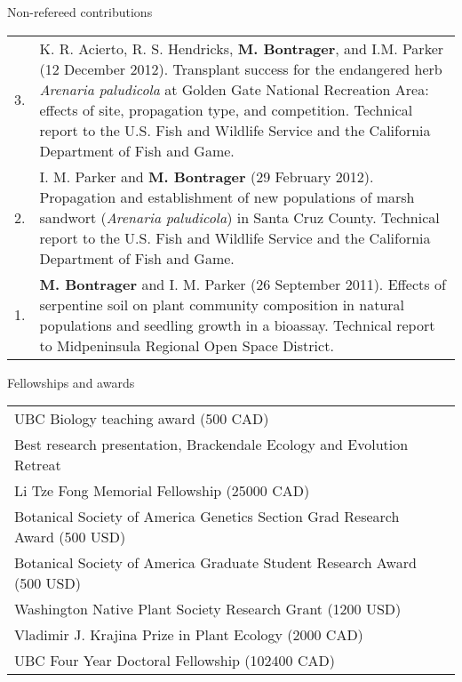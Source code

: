 \documentclass[letterpaper,11pt,oneside]{article}
\begin{document}
\bigskip
\bigskip


\bgroup
\noindent\Large{Non-refereed contributions}  
\normalsize
\bigskip

\def\arraystretch{1.2}
\noindent \begin{tabular}{@{} p{1cm} >{\raggedright\arraybackslash}p{15.11cm}}
3. & K. R. Acierto, R. S. Hendricks, \textbf{M. Bontrager}, and I.M. Parker (12 December 2012). Transplant success for the endangered herb \textit{Arenaria paludicola} at Golden Gate National Recreation Area: effects of site, propagation type, and competition. Technical report to the U.S. Fish and Wildlife Service and the California Department of Fish and Game. \\
2. & I. M. Parker and \textbf{M. Bontrager} (29 February 2012). Propagation and establishment of new populations of marsh sandwort (\textit{Arenaria paludicola}) in Santa Cruz County. Technical report to the U.S. Fish and Wildlife Service and the California Department of Fish and Game. \\
1. & \textbf{M. Bontrager} and I. M. Parker (26 September 2011). Effects of serpentine soil on plant community composition in natural populations and seedling growth in a bioassay. Technical report to Midpeninsula Regional Open Space District. \\
\end{tabular}
\egroup
\bigskip
\bigskip

\newpage




\bgroup
\noindent\Large{Fellowships and awards}
\bigskip

\normalsize
\noindent \begin{tabular}{@{} >{\raggedright\arraybackslash}p{14.91cm} >{\raggedleft\arraybackslash}p{1.2cm}}
UBC Biology teaching award (500 CAD) & 2018 \\
Best research presentation, Brackendale Ecology and Evolution Retreat & 2016 \\
Li Tze Fong Memorial Fellowship (25000 CAD) & 2016 \\
Botanical Society of America Genetics Section Grad Research Award (500 USD) & 2016 \\
Botanical Society of America Graduate Student Research Award (500 USD) & 2016 \\
Washington Native Plant Society Research Grant (1200 USD) & 2016 \\
Vladimir J. Krajina Prize in Plant Ecology (2000 CAD) & 2013 \\
UBC Four Year Doctoral Fellowship (102400 CAD) & 2012 \\
\end{tabular}
\egroup
\bigskip
\bigskip
 
\end{document}
